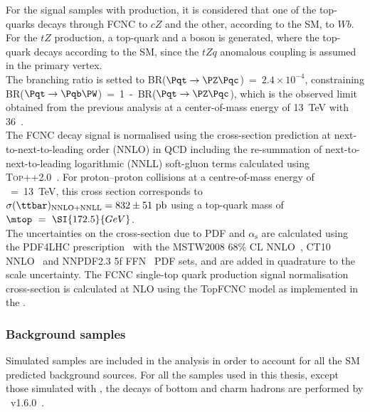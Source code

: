 \noindent For the signal samples with \ttbar production, it is considered that one of the top-quarks decays through FCNC to $cZ$ and the other, according to the SM, to $Wb$.\\ 
For the $tZ$ production, a top-quark and a \PZ boson is generated, where the top-quark decays according to the SM, since the $tZq$ anomalous coupling is assumed in the primary vertex. \\
The branching ratio is setted to \mbox{BR($\mathrm{\Pqt\rightarrow\PZ\Pqc}$) = $2.4\times10^{-4}$}, constraining\\ \mbox{BR($\Pqt\rightarrow \Pqb \PW$) = 1 - BR($\mathrm{\Pqt\rightarrow\PZ\Pqc}$)}, which is the observed limit obtained from
the previous analysis at a center-of-mass energy of \SI{13}{\TeV} with \SI{36}{\ifb}~\cite{TOPQ-2017-06}. \\ 
The FCNC \ttbar decay signal
is normalised using the \ttbar cross-section prediction at next-to-next-to-leading order (NNLO)
in QCD including the re-summation of next-to-next-to-leading logarithmic (NNLL) soft-gluon terms calculated using
\textsc{Top++2.0}~\cite{Beneke:2011mq,Cacciari:2011hy,Baernreuther:2012ws,Czakon:2012zr,Czakon:2012pz,Czakon:2013goa,Czakon:2011xx}.
For proton--proton collisions at a centre-of-mass energy of \rts~=~\SI{13}{\TeV}, this cross section corresponds to
$\sigma(\ttbar)_{\textrm{NNLO+NNLL}} = \mathrm{832\pm51~pb}$ using a top-quark mass of $\mtop~ =~\SI{172.5}{GeV}$.\\
The uncertainties on the cross-section due to PDF and $\alpha_{\textrm{s}}$ are calculated using the PDF4LHC prescription~\cite{Botje:2011sn}
with the MSTW2008 68\% CL NNLO~\cite{Martin:2009iq,Martin:2009bu}, CT10 NNLO~\cite{Lai:2010vv,Gao:2013xoa} and \textsc{NNPDF2.3} 5f FFN~\cite{Ball:2012cx} PDF sets,
and are added in quadrature to the scale uncertainty.
The FCNC single-top quark production signal normalisation cross-section is calculated at 
NLO using the TopFCNC model as implemented in the \aMCatNLO.  \\

\subsubsection{Background samples}
\label{sec:samples:mc:bkg}

Simulated samples are included in the analysis in order to account for all the SM predicted background sources. For all the samples used in this thesis, except those simulated with \sherpa, the decays of bottom and charm hadrons are performed by \evtgen~v1.6.0~\cite{Lange:2001uf}.

